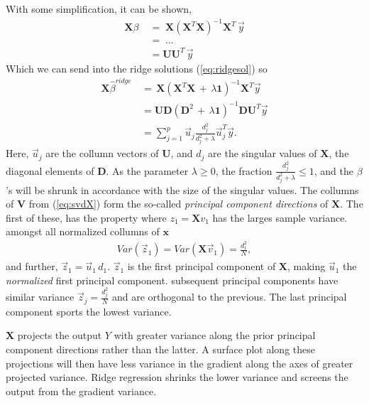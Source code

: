 \documentclass[ 12pt, a4paper ]{article}
\begin{document}
With some simplification, it can be shown,
\begin{align}
    \mathbf{X}\beta  \;&=\; \mathbf{X}(\mathbf{X}^T\mathbf{X})^{-1}\mathbf{X}^T\, \vec{y}
    \nonumber \\
                       &= \;\ldots\nonumber \\
                       &= \mathbf{U}\mathbf{U}^T \, \vec{y}
\end{align}
Which we can send into the ridge solutions (\ref{eq:ridgesol}) so
\begin{align}
    \mathbf{X}\hat{\beta}^{ridge} \,&=\, 
    \mathbf{X}(\mathbf{X}^T\mathbf{X} \,+\,\lambda \mathbf{1})^{-1}\mathbf{X}^T \vec{y}
    \nonumber \\
    &= \mathbf{U}\mathbf{D}(\mathbf{D}^2 
    \,+\,\lambda \mathbf{1})^{-1}\mathbf{D}\mathbf{U}^T \vec{y}
    \nonumber \\
    &= \sum_{j=1}^p \vec{u}_j \frac{d_j^2}{d_j^2 + \lambda} \vec{u}_j^T \vec{y}.
\end{align}
Here, $\vec{u}_j$ are the collumn vectors of $\mathbf{U}$, and $d_j$ are the singular values 
of $\mathbf{X}$, the diagonal elements of $\mathbf{D}$. As the parameter $\lambda \geq 0$, the
fraction $\frac{d_j^2}{d_j^2 + \lambda} \leq 1$, and the $\beta$'s will be shrunk in accordance
with the size of the singular values. The collumns of $\mathbf{V}$ from (\ref{eq:svdX}) form the
so-called \textit{principal component directions} of $\mathbf{X}$. The first of these, has the 
property where $z_1 = \mathbf{X}v_1$ has the larges sample variance. amongst all normalized
collumns of $\mathbf{x}$
\begin{align}
    Var(\vec{z}_1) = Var(\mathbf{X}\vec{v}_1) = \frac{d_1^2}{N},
\end{align}
and further, $\vec{z}_1 = \vec{u}_1\,d_1$. $\vec{z}_1$ is the first principal component of 
$\mathbf{X}$, making $\vec{u}_1$ the \textit{normalized} first principal component. subsequent 
principal components have similar variance $\vec{z}_j = \frac{d_j^2}{N}$ and are orthogonal to
the previous. The last principal component sports the lowest variance.

$\mathbf{X}$ projects the output $Y$ with greater variance along the prior principal component
directions rather than the latter. A surface plot along these projections will then have less 
variance in the gradient along the axes of greater projected variance. Ridge regression shrinks 
the lower variance and screens the output from the gradient variance.
\end{document}
